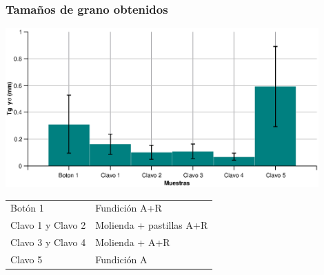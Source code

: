 \documentclass[usenames,dvipsnames]{beamer}
\begin{document}
 
 \begin{frame}
 
\frametitle{Tamaños de grano obtenidos}
\begin{center}
\includegraphics[width=0.9\textwidth]{img/tamgrano/TamGranos.eps} 

\begin{small}
\begin{tabular}{ll}  \toprule
Botón 1  & Fundición A+R \\
Clavo 1 y Clavo 2 & Molienda + pastillas A+R \\
Clavo 3 y Clavo 4 &  Molienda + A+R \\
Clavo 5  & Fundición A \\
\bottomrule
\end{tabular}
\end{small}

\end{center}


\end{frame}
 
 
\end{document}
